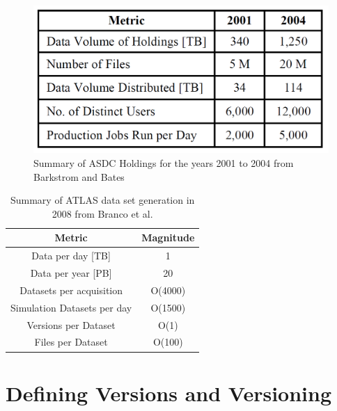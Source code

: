 \begin{figure}
	\centering
	\includegraphics[scale=0.40]{figures/ASDCHoldings.png}
	\caption{Summary of ASDC Holdings for the years 2001 to 2004 from Barkstrom and Bates \cite{Barkstrom_digitallibrary}}
	\label{table:ASDC}
\end{figure}

\begin{table}
	\centering
	\begin{tabular}{ | c | c |}
		\hline
		Metric & Magnitude \\
		\hline
		Data per day [TB] & 1 \\
		Data per year [PB] & 20 \\
		Datasets per acquisition & O(4000) \\
		Simulation Datasets per day & O(1500) \\
		Versions per Dataset & O(1) \\
		Files per Dataset & O(100) \\
		\hline
	\end{tabular}
	\caption{Summary of ATLAS data set generation in 2008 from Branco et al.\cite{Branco2008}}
	\label{table:Atlas}
\end{table}

\section{Defining Versions and Versioning}

